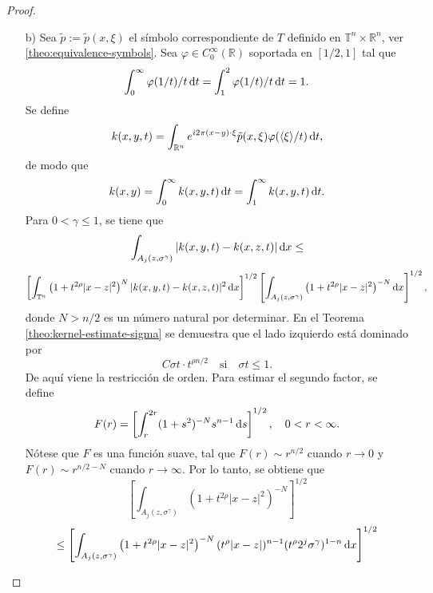 \begin{proof}
\begin{itemize}
		\item[b)] Sea $\tilde{p}:=\tilde{p}(x,\xi)$ el símbolo correspondiente de $T$ definido en $\mathbb{T}^n \times \mathbb{R}^n$, ver \cref{theo:equivalence-symbols}.  Sea $\varphi \in C_0^\infty(\mathbb{R})$ soportada en $[1/2, 1]$ tal que  
		\begin{equation*}
			\int_0^\infty \varphi(1/t)/t\mathop{}\!\mathrm{d} t = \int_1^2 \varphi(1/t)/t\mathop{}\!\mathrm{d} t=1.
		\end{equation*}
		Se define 
		\begin{equation*}
			k(x, y, t) = \int_{\mathbb{R}^n} e^{i2\pi (x-y) \cdot \xi} \tilde{p}(x, \xi) \varphi(\langle\xi\rangle/t)\mathop{}\!\mathrm{d} t,
		\end{equation*}
		de modo que 
		\begin{equation*}
			k(x, y) = \int_0^\infty k(x, y, t) \mathop{}\!\mathrm{d} t = \int_1^\infty k(x, y, t) \mathop{}\!\mathrm{d} t.
		\end{equation*}
		Para $0<\gamma\leq1$, se tiene que 
		\begin{equation*}
			\int_{A_j(z, \sigma^\gamma)} |k(x, y, t) - k(x, z, t)| \mathop{}\!\mathrm{d} x \leq
		\end{equation*}
		\begin{equation*}
			\left[ \int_{\mathbb{T}^n} \left(1 + t^{2\rho} |x-z|^2\right)^N 
			|k(x, y, t) - k(x, z, t)|^2 \mathop{}\!\mathrm{d} x
			\right]^{1/2}  \left[ \int_{A_j(z, \sigma^\gamma)} \left(1 + t^{2\rho} |x-z|^2\right)^{-N} \mathop{}\!\mathrm{d} x  \right]^{1/2},
		\end{equation*}
		donde $N>n/2$ es un número natural por determinar. En el Teorema  \ref{theo:kernel-estimate-sigma}  se demuestra que el lado izquierdo está dominado por 
		\begin{equation*}
			C\sigma t \cdot t^{\rho n/2} \quad \text{si} \quad \sigma t\leq 1. 
		\end{equation*}
		De aquí viene la restricción de orden. Para estimar el segundo factor, se define 
		\begin{equation*}
			F(r) = \left[ \int_r^{2r} (1+s^2)^{-N} s^{n-1} \mathop{}\!\mathrm{d} s  \right]^{1/2}, \quad 0<r<\infty. 
		\end{equation*}
		Nótese que $F$ es una función suave, tal que $F(r) \sim r^{n/2}$ cuando $r\rightarrow 0$ y $F(r)\sim r^{n/2-N}$ cuando $r \rightarrow \infty$. Por lo tanto, se obtiene que
		\begin{equation*}
			\left[ \int_{A_j(z, \sigma^\gamma)} \left(1 + t^{2\rho} |x-z|^2\right)^{-N}  \right]^{1/2}
		\end{equation*}
		\begin{equation*}
			\leq \left[ \int_{A_j(z, \sigma^\gamma)} \left(1 + t^{2\rho} |x-z|^2\right)^{-N} (t^\rho|x-z|)^{n-1} (t^\rho 2^j \sigma^\gamma)^{1-n} \diff x  \right]^{1/2}

\end{equation*}
\end{itemize}
\end{proof}
